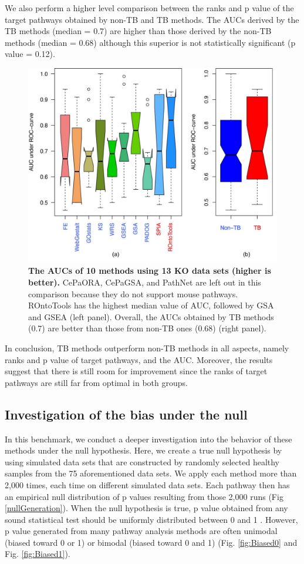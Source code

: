 \documentclass[Minh_PhD_thesis.tex]{subfiles}
\begin{document}
We also perform a higher level comparison between the ranks and p value of the target pathways obtained by non-TB and TB methods. The AUCs derived by the TB methods (median = 0.7) are higher than those derived by the non-TB methods (median = 0.68) although this superior is not statistically significant (p value = 0.12). 


\begin{figure}
\centering
	\includegraphics[width=0.8\linewidth]{../Figures/AUC_combined_v3}
  \caption{\textbf{The AUCs of 10 methods using 13 KO data sets (higher is better).} CePaORA, CePaGSA, and PathNet are left out in this comparison because they do not support mouse pathways. ROntoTools has the highest median value of AUC, followed by GSA and GSEA (left panel). Overall, the AUCs obtained by TB methods (0.7) are better than those from non-TB ones (0.68) (right panel). }
  \label{fig:AUC}
\end{figure}




In conclusion, TB methods outperform non-TB methods in all aspects, namely ranks and p value of target pathways, and the AUC. 
Moreover, the results suggest that there is still room for improvement since the ranks of target pathways are still far from optimal in both groups.

\subsection{Investigation of the bias under the null}

In this benchmark, we conduct a deeper investigation into the behavior of these methods under the null hypothesis. 
Here, we create a true null hypothesis by using simulated data sets that are constructed by randomly selected healthy samples from the 75 aforementioned data sets.
We apply each method  more than 2,000 times, each time on different simulated data sets.
Each pathway then has an empirical null distribution of p values resulting from those 2,000 runs (Fig \ref{nullGeneration}).
When the null hypothesis is true, p value obtained from any sound statistical test should be uniformly distributed  between 0 and 1 \cite{barton2013correction, fodor2007towards}.
However, p value generated from many pathway analysis methods are often unimodal (biased toward 0 or 1) or bimodal (biased toward 0 and 1) (Fig. \ref{fig:Biased0} and Fig. \ref{fig:Biased1}). 
\end{document}

